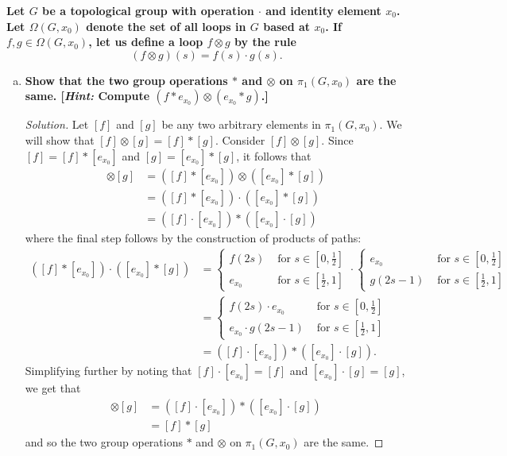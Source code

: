 \documentclass[11pt]{article}
\newenvironment{solution}
  {\renewcommand\qedsymbol{$\blacksquare$}\begin{proof}[Solution]}
  {\end{proof}}
\begin{document}
\textbf{Let $G$ be a topological group with operation $\cdot$ and identity element $x_0$. Let $\Omega(G, x_0)$ denote the set of all loops in $G$ based at $x_0$. If $f, g \in \Omega(G, x_0)$, 
let us define a loop $f \otimes g$ by the rule}
\[
    (f \otimes g)(s) = f(s) \cdot g(s).
\]
\begin{enumerate}[c)]
    \item \textbf{Show that the two group operations $*$ and $\otimes$ on $\pi_1(G, x_0)$ are the same. [\textit{Hint:} Compute $(f * e_{x_0}) \otimes (e_{x_0} * g)$.]}
    
    \begin{solution}
    Let $[f]$ and $[g]$ be any two arbitrary elements in $\pi_1(G, x_0)$. We will show that $[f] \otimes [g] = [f] * [g]$.
    Consider $[f] \otimes [g]$. Since $[f] = [f] * [e_{x_0}]$ and $[g] = [e_{x_0}] * [g]$, it follows that
    \begin{align*}
        [f] \otimes [g] &= ([f] * [e_{x_0}]) \otimes ([e_{x_0}] * [g]) \\
        &= ([f] * [e_{x_0}]) \cdot ([e_{x_0}] * [g]) \\
        &= ([f] \cdot [e_{x_0}]) * ([e_{x_0}] \cdot [g])
    \end{align*}
    where the final step follows by the construction of products of paths:  
    \begin{align*}
        ([f] * [e_{x_0}]) \cdot ([e_{x_0}] * [g]) 
        &= \begin{cases}
            f(2s) &\text{ for } s \in \left[ 0, \frac{1}{2} \right]  \\
            e_{x_0} &\text{ for } s \in \left[\frac{1}{2}, 1 \right]
        \end{cases}
        \cdot
        \begin{cases}
            e_{x_0} &\text{ for } s \in \left[ 0, \frac{1}{2} \right]  \\
            g(2s-1) &\text{ for } s \in \left[\frac{1}{2}, 1 \right]
        \end{cases} \\
        &= \begin{cases}
            f(2s) \cdot e_{x_0} &\text{ for } s \in \left[ 0, \frac{1}{2} \right]  \\
            e_{x_0} \cdot g(2s-1) &\text{ for } s \in \left[\frac{1}{2}, 1 \right]
        \end{cases} \\
        &= ([f] \cdot [e_{x_0}]) * ([e_{x_0}] \cdot [g]).
    \end{align*}
    Simplifying further by noting that $[f] \cdot [e_{x_0}] = [f]$ and $[e_{x_0}] \cdot [g] = [g]$, we get that
    \begin{align*}
        [f] \otimes [g] &= ([f] \cdot [e_{x_0}]) * ([e_{x_0}] \cdot [g]) \\
        &= [f] * [g]
    \end{align*}
    and so the two group operations $*$ and $\otimes$ on $\pi_1(G, x_0)$ are the same.
    \end{solution}


\end{enumerate}
\end{document}
